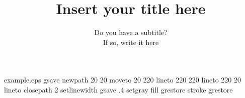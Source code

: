 %
%
%
%
%
\begin{filecontents*}{example.eps}
gsave
newpath
  20 20 moveto
  20 220 lineto
  220 220 lineto
  220 20 lineto
closepath
2 setlinewidth
gsave
  .4 setgray fill
grestore
stroke
grestore
\end{filecontents*}
%
\RequirePackage{fix-cm}
%
\documentclass[smallextended]{svjour3}       %
%
\smartqed  %
%
\usepackage{graphicx}
\usepackage{setspace}
\usepackage{amsmath}
\usepackage{amssymb}
\usepackage{algorithm}
\usepackage[noend]{algpseudocode}
\usepackage{fullpage}
\usepackage{array}
\allowdisplaybreaks
\usepackage{arydshln}
\usepackage[hyphens]{url}

\newcommand{\st}{\mbox{s.t.}}
\newcommand{\uS}{{\underline{S}}}
\newcommand{\oS}{{\overline{S}}}
\newcommand{\oQ}{{\overline{Q}}}
\newcommand{\oP}{{\overline{P}}}
\newcommand{\oX}{{\overline{X}}}
\newcommand{\uX}{{\underline{X}}}
\renewcommand{\P}{{\mathbb P}}
\newcommand{\E}{{\mathbb E}}
%
%
%
%
%


\title{Insert your title here%
}
\subtitle{Do you have a subtitle?\\ If so, write it here}

